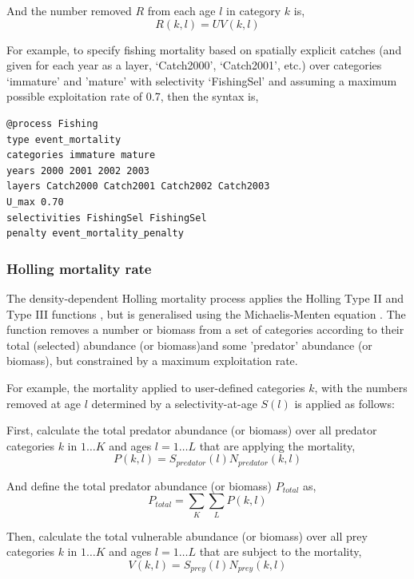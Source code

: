 And the number removed $R$ from each age $l$ in category $k$ is,
\begin{equation}
  R(k,l) = UV(k,l)
\end{equation}

For example, to specify fishing mortality based on spatially explicit catches (and given for each year as a layer, `Catch2000', `Catch2001', etc.) over categories `immature' and 'mature' with selectivity `FishingSel' and assuming a maximum possible exploitation rate of 0.7, then the syntax is,
{\small{\begin{verbatim}
@process Fishing
type event_mortality
categories immature mature
years 2000 2001 2002 2003
layers Catch2000 Catch2001 Catch2002 Catch2003
U_max 0.70
selectivities FishingSel FishingSel
penalty event_mortality_penalty
\end{verbatim}}}

\subsubsection*{Holling mortality rate}

The density-dependent Holling mortality process applies the Holling Type II and Type III functions \citep{Holling1959}, but is generalised using the Michaelis-Menten equation \citep{MentenMichaelis1913}. The function removes a number or biomass from a set of categories according to their total (selected) abundance (or biomass)and some 'predator' abundance (or biomass), but constrained by a maximum exploitation rate.

For example, the mortality applied to user-defined categories $k$, with the numbers removed at age $l$ determined by a selectivity-at-age $S(l)$ is applied as follows:

First, calculate the total predator abundance (or biomass) over all predator categories $k$ in $1 \ldots K$ and ages $l = 1 \ldots L$ that are applying the mortality,
\begin{equation}
  P(k,l) = S_{predator}(l) N_{predator}(k,l)
\end{equation}

And define the total predator abundance (or biomass) $P_{total}$ as,
\begin{equation}
  P_{total}  = \sum\limits_K {\sum\limits_L {P(k,l)}} 
\end{equation}

Then, calculate the total vulnerable abundance (or biomass) over all prey categories $k$ in $1 \ldots K$ and ages $l = 1 \ldots L$ that are subject to the mortality,
\begin{equation}
  V(k,l) = S_{prey}(l) N_{prey}(k,l)
\end{equation}

